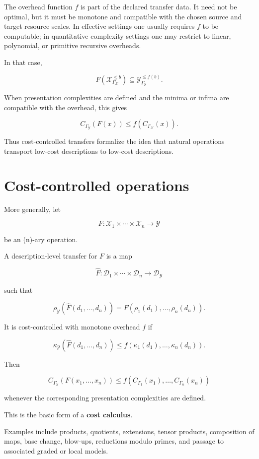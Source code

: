 \documentclass[11pt]{article}
\begin{document}
The overhead function \(f\) is part of the declared transfer data. It need not be optimal, but it must be monotone and compatible with the chosen source and target resource scales. In effective settings one usually requires \(f\) to be computable; in quantitative complexity settings one may restrict to linear, polynomial, or primitive recursive overheads.

In that case,

\[
F(\mathcal X_{\Gamma_\mathcal X}^{\leq b})
\subseteq
\mathcal Y_{\Gamma_\mathcal Y}^{\leq f(b)}.
\]

When presentation complexities are defined and the minima or infima are compatible with the overhead, this gives

\[
C_{\Gamma_\mathcal Y}(F(x))
\leq
f(C_{\Gamma_\mathcal X}(x)).
\]

Thus cost-controlled transfers formalize the idea that natural operations transport low-cost descriptions to low-cost descriptions.


\section{Cost-controlled operations}

More generally, let

\[
F:\mathcal X_1\times\cdots\times \mathcal X_n\to \mathcal Y
\]

be an (n)-ary operation.

A description-level transfer for \(F\) is a map

\[
\widehat F:
\mathcal D_1\times\cdots\times \mathcal D_n
\to
\mathcal D_\mathcal Y
\]

such that

\[
\rho_\mathcal Y(\widehat F(d_1,\dots,d_n))=F(\rho_1(d_1),\dots,\rho_n(d_n)).
\]

It is cost-controlled with monotone overhead \(f\) if

\[
\kappa_\mathcal Y(\widehat F(d_1,\dots,d_n))
\leq
f(\kappa_1(d_1),\dots,\kappa_n(d_n)).
\]

Then

\[
C_{\Gamma_\mathcal Y}(F(x_1,\dots,x_n))
\leq
f(C_{\Gamma_1}(x_1),\dots,C_{\Gamma_n}(x_n))
\]

whenever the corresponding presentation complexities are defined.

This is the basic form of a \textbf{cost calculus}.

Examples include products, quotients, extensions, tensor products, composition of maps, base change, blow-ups, reductions modulo primes, and passage to associated graded or local models.
\end{document}
